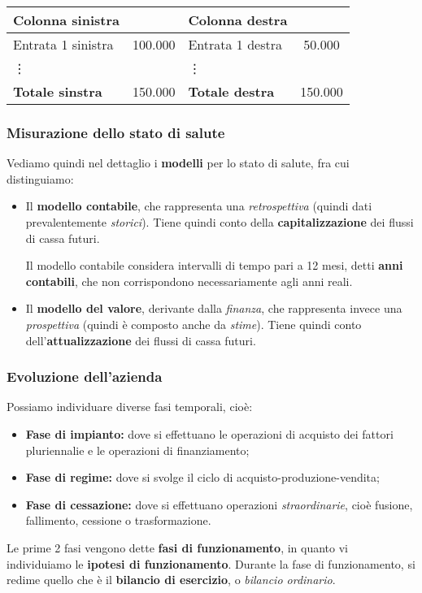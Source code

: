 \documentclass[a4paper,11pt]{article}
\begin{document}
\begin{table}[h!]
	\center {}
	\begin{tabular} { p{4cm} c | p{4cm} c }
		\bfseries Colonna sinistra &  & \bfseries Colonna destra & \\	
		\hline 
		Entrata 1 sinistra & 100.000 & Entrata 1 destra & 50.000 \\ 
		\vdots & & \vdots & \\
		\bfseries Totale sinstra & 150.000 & \bfseries Totale destra & 150.000 
	\end{tabular}
\end{table}

\subsubsection{Misurazione dello stato di salute}
Vediamo quindi nel dettaglio i \textbf{modelli} per lo stato di salute, fra cui distinguiamo:
\begin{itemize}
	\item Il \textbf{modello contabile}, che rappresenta una \textit{retrospettiva} (quindi dati prevalentemente \textit{storici}).
		Tiene quindi conto della \textbf{capitalizzazione} dei flussi di cassa futuri.
		
		Il modello contabile considera intervalli di tempo pari a 12 mesi, detti \textbf{anni contabili}, che non corrispondono necessariamente agli anni reali.
	\item Il \textbf{modello del valore}, derivante dalla \textit{finanza}, che rappresenta invece una \textit{prospettiva} (quindi è composto anche da \textit{stime}).
		Tiene quindi conto dell'\textbf{attualizzazione} dei flussi di cassa futuri.
\end{itemize}

\subsubsection{Evoluzione dell'azienda}
Possiamo individuare diverse fasi temporali, cioè:
\begin{itemize}
	\item \textbf{Fase di impianto:} dove si effettuano le operazioni di acquisto dei fattori pluriennalie e le operazioni di finanziamento;
	\item \textbf{Fase di regime:} dove si svolge il ciclo di acquisto-produzione-vendita;
	\item \textbf{Fase di cessazione:} dove si effettuano operazioni \textit{straordinarie}, cioè fusione, fallimento, cessione o trasformazione. 
\end{itemize}
Le prime 2 fasi vengono dette \textbf{fasi di funzionamento}, in quanto vi individuiamo le \textbf{ipotesi di funzionamento}.
Durante la fase di funzionamento, si redime quello che è il \textbf{bilancio di esercizio}, o \textit{bilancio ordinario}.
\end{document}
